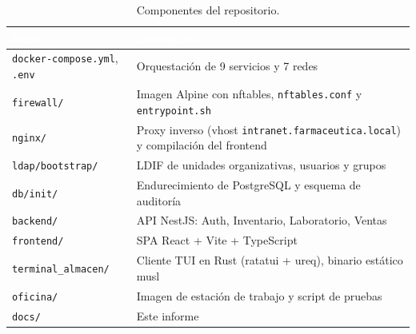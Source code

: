\documentclass[11pt,a4paper,oneside]{report}
\newcommand{\cod}[1]{\texttt{\small #1}}
\begin{document}
\begin{table}[htbp]
\centering\small
\caption{Componentes del repositorio.}
\begin{tabularx}{\textwidth}{@{}l X@{}}
\toprule
\rowcolor{fvVerdeOsc}\textcolor{white}{\textbf{Ruta}} & \textcolor{white}{\textbf{Contenido}} \\
\midrule
\cod{docker-compose.yml}, \cod{.env} & Orquestación de 9 servicios y 7 redes \\
\cod{firewall/}         & Imagen Alpine con nftables, \cod{nftables.conf} y \cod{entrypoint.sh} \\
\cod{nginx/}            & Proxy inverso (vhost \cod{intranet.farmaceutica.local}) y compilación del frontend \\
\cod{ldap/bootstrap/}   & LDIF de unidades organizativas, usuarios y grupos \\
\cod{db/init/}          & Endurecimiento de PostgreSQL y esquema de auditoría \\
\cod{backend/}          & API NestJS: Auth, Inventario, Laboratorio, Ventas \\
\cod{frontend/}         & SPA React + Vite + TypeScript \\
\cod{terminal\_almacen/} & Cliente TUI en Rust (ratatui + ureq), binario estático musl \\
\cod{oficina/}          & Imagen de estación de trabajo y script de pruebas \\
\cod{docs/}             & Este informe \\
\bottomrule
\end{tabularx}
\end{table}
\end{document}
